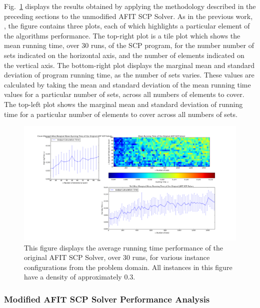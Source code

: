 \documentclass[12pt]{article}
\begin{document}
	Fig.~\ref{fig:runtime_analysis_original_density0p3} displays the results obtained by applying the methodology described  in the preceding sections to the unmodified AFIT SCP Solver. As in the previous work, \cite{hw5_knapp_fletcher_csce_686}, the figure contains three plots, each of which highlights a particular element of the algorithms performance. The top-right plot is a tile plot which shows the mean running time, over $30$ runs, of the SCP program, for the number number of sets indicated on the horizontal axis, and the number of elements indicated on the vertical axis. The bottom-right plot displays the marginal mean and standard deviation of program running time, as the number of sets varies. These values are calculated by taking the mean and standard deviation of the mean running time values for a particular number of sets, across all numbers of elements to cover. The top-left plot shows the marginal mean and standard deviation of running time for a particular number of elements to cover across all numbers of sets.
	\begin{figure}[ht!]\label{fig:runtime_analysis_original_density0p3}
		
		\centering
		\centerline{\includegraphics[width = 6.7in]{running_time_original_density0p3.png}}
		\hfill
		
		\caption{This figure displays the average running time performance of the original AFIT SCP Solver, over $30$ runs, for various instance configurations from the problem domain. All instances in this figure have a density of approximately $0.3$.}
		
	\end{figure}
	
	\subsubsection{Modified AFIT SCP Solver Performance Analysis}
	
\end{document}
